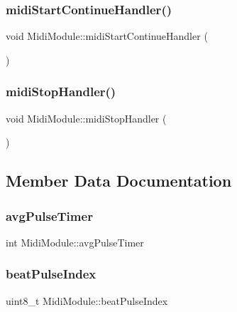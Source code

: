 \subsubsection{\texorpdfstring{midi\+Start\+Continue\+Handler()}{midiStartContinueHandler()}}
{\footnotesize\ttfamily void Midi\+Module\+::midi\+Start\+Continue\+Handler (\begin{DoxyParamCaption}{ }\end{DoxyParamCaption})}

\mbox{\label{class_midi_module_a0dc8fc76183fd5b102b1e35a12373088}} 
\subsubsection{\texorpdfstring{midi\+Stop\+Handler()}{midiStopHandler()}}
{\footnotesize\ttfamily void Midi\+Module\+::midi\+Stop\+Handler (\begin{DoxyParamCaption}{ }\end{DoxyParamCaption})}



\subsection{Member Data Documentation}
\mbox{\label{class_midi_module_af1cd2b4bdb8585148d1cb4fa8b283999}} 
\subsubsection{\texorpdfstring{avg\+Pulse\+Timer}{avgPulseTimer}}
{\footnotesize\ttfamily int Midi\+Module\+::avg\+Pulse\+Timer\hspace{0.3cm}{\ttfamily [private]}}

\mbox{\label{class_midi_module_a8e3b952f2432be01a9eadc72983deca2}} 
\subsubsection{\texorpdfstring{beat\+Pulse\+Index}{beatPulseIndex}}
{\footnotesize\ttfamily uint8\+\_\+t Midi\+Module\+::beat\+Pulse\+Index\hspace{0.3cm}{\ttfamily [private]}}

